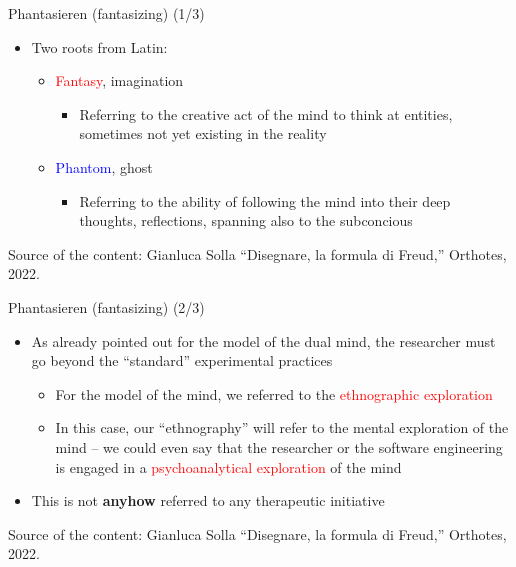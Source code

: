 \documentclass{beamer}
\begin{document}
\begin{frame}
{\centerline{Phantasieren (fantasizing) (1/3)}}
 
\begin{itemize}
   \item Two roots from Latin:
\begin{itemize}
   \item \textcolor{red}{Fantasy}, imagination
   \begin{itemize}
   \item Referring to the creative act of the mind to think at entities, sometimes not yet existing in the reality
    \end{itemize} 
   \item \textcolor{blue}{Phantom}, ghost
      \begin{itemize}
   \item Referring to the ability of following the mind into their deep thoughts, reflections, spanning also to the subconcious
    \end{itemize} 
 \end{itemize} 
  \end{itemize} 

\begin{center}
\tiny
Source of the content: Gianluca Solla ``Disegnare, la formula di Freud,'' Orthotes, 2022.
\end{center}
\end{frame}


\begin{frame}
{\centerline{Phantasieren (fantasizing) (2/3)}}
 
\begin{itemize}
 \item As already pointed out for the model of the dual mind, the researcher must go beyond the ``standard'' experimental practices
       \begin{itemize}
   \item For the model of the mind, we referred to the \textcolor{red}{ethnographic exploration}
   \item In this case, our ``ethnography'' will refer to the mental exploration of the mind -- we could even say that the researcher or the software engineering is engaged in a \textcolor{red}{psychoanalytical exploration} of the mind
       \end{itemize} 
   \item This is not \textbf{anyhow} referred to any therapeutic initiative
 \end{itemize} 
 
\begin{center}
\tiny
Source of the content: Gianluca Solla ``Disegnare, la formula di Freud,'' Orthotes, 2022.
\end{center}
\end{frame}
\end{document}
